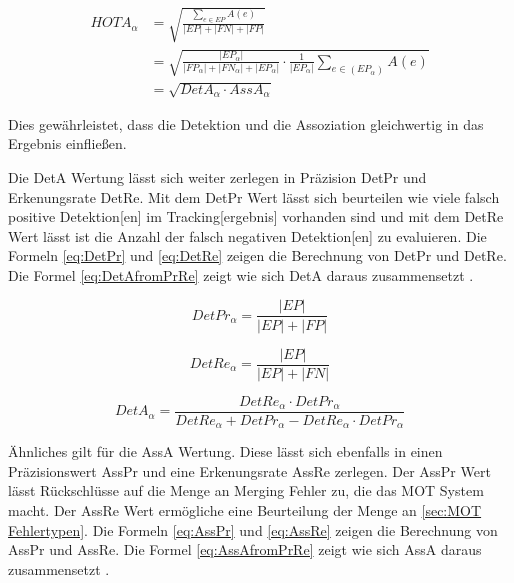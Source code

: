 \begin{equation}
\begin{split}
    \label{eq:HOTAalphaGeoMean}
    HOTA_{\alpha} &= \sqrt{\frac{\sum_{e \in EP} A(e)}{|EP| + |FN| + |FP|}} \\ 
    &= \sqrt{\frac{|EP_{\alpha}|}{|FP_{\alpha}| + |FN_{\alpha}| + |EP_{\alpha}|} \cdot \frac{1}{|EP_{\alpha}|} \sum_{e \in (EP_{\alpha})} A(e)} \\ 
    &= \sqrt{DetA_{\alpha} \cdot AssA_{\alpha}}
\end{split}
\end{equation}

Dies gewährleistet, dass die \gls{Detektion} und die \gls{Assoziation} gleichwertig in das Ergebnis einfließen. \par

Die \gls{DetA} Wertung lässt sich weiter zerlegen in Präzision \gls{DetPr} und Erkenungsrate \gls{DetRe}. Mit dem \gls{DetPr} Wert lässt sich beurteilen wie viele falsch positive \gls{Detektion}[en] im \gls{Tracking}[ergebnis] vorhanden sind und mit dem \gls{DetRe} Wert lässt ist die Anzahl der falsch negativen \gls{Detektion}[en] zu evaluieren. Die Formeln \ref{eq:DetPr} und \ref{eq:DetRe} zeigen die Berechnung von \gls{DetPr} und \gls{DetRe}. Die Formel \ref{eq:DetAfromPrRe} zeigt wie sich \gls{DetA} daraus zusammensetzt \cite{HOTA}.

\begin{equation}
    \label{eq:DetPr}
    DetPr_{\alpha} = \frac{|EP|}{|EP| + |FP|}
\end{equation}

\begin{equation}
    \label{eq:DetRe}
    DetRe_{\alpha} = \frac{|EP|}{|EP| + |FN|}
\end{equation}

\begin{equation}
    \label{eq:DetAfromPrRe}
    DetA_{\alpha} = \frac{ DetRe_{\alpha} \cdot DetPr_{\alpha} }{ DetRe_{\alpha} + DetPr_{\alpha} -  DetRe_{\alpha} \cdot DetPr_{\alpha}}
\end{equation}

Ähnliches gilt für die \gls{AssA} Wertung. Diese lässt sich ebenfalls in einen  Präzisionswert \gls{AssPr} und eine Erkenungsrate \gls{AssRe} zerlegen. Der \gls{AssPr} Wert lässt Rückschlüsse auf die Menge an \gls{Merging Fehler} zu, die das \gls{MOT} System macht. Der \gls{AssRe} Wert ermögliche eine Beurteilung der Menge an  \ref{sec:MOT Fehlertypen}. Die Formeln \ref{eq:AssPr} und \ref{eq:AssRe} zeigen die Berechnung von \gls{AssPr} und \gls{AssRe}. Die Formel \ref{eq:AssAfromPrRe} zeigt wie sich \gls{AssA} daraus zusammensetzt \cite{HOTA}. 

